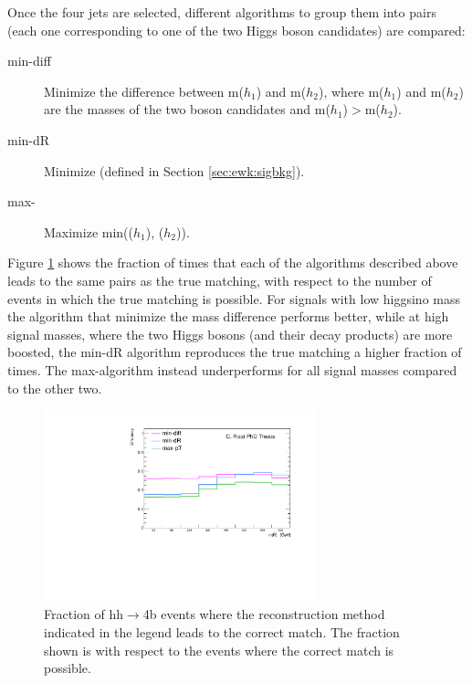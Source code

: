 Once the four jets are selected, 
different algorithms to group them into pairs (each one corresponding to one of the two Higgs boson candidates) 
are compared: 

\begin{description}
\item[min-diff] Minimize the difference between m($h_1$)  and m($h_2$), where m($h_1$) and m($h_2$) are the masses of the two boson candidates and 
m($h_1$)$>$m($h_2$).
\item[min-dR] Minimize \dRmax (defined in Section \ref{sec:ewk:sigbkg}).
\item[max-\pt] Maximize min(\pt($h_1$), \pt($h_2$)).
\end{description}


Figure \ref{fig:h_reco_best_match} shows the fraction of times that each of the algorithms 
described above leads to the same pairs as the true matching, with respect to the number of events in which the true matching is possible. 
For signals with low higgsino mass the algorithm that minimize the mass difference performs better, 
while at high signal masses, where the two Higgs bosons (and their decay products) are more boosted, 
the min-dR algorithm reproduces the true matching a higher fraction of times. 
The max-\pt algorithm instead underperforms for all signal masses compared to the other 
two. 

\begin{figure}[h]
\centering
\includegraphics[width=0.7\textwidth]{figures/App2/Rizzi-FigA2-2.pdf}
\caption{Fraction of hh$\to$4b events where the reconstruction method indicated in the legend leads to the correct match. The fraction shown is with respect to the events where the correct match is possible.}
\label{fig:h_reco_best_match}
\end{figure}

